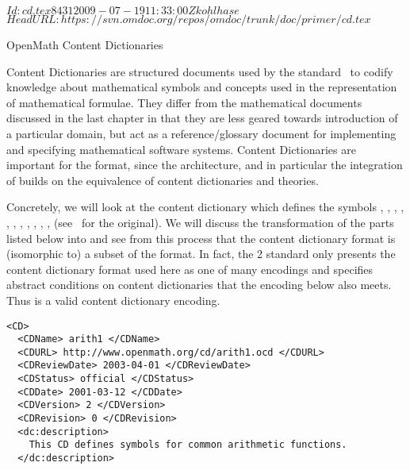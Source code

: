 \svnInfo $Id: cd.tex 8431 2009-07-19 11:33:00Z kohlhase $
\svnKeyword $HeadURL: https://svn.omdoc.org/repos/omdoc/trunk/doc/primer/cd.tex $

\begin{omgroup}[id=omcds]{OpenMath Content Dictionaries}

  Content Dictionaries are structured documents used by the {\openmath}
  standard~\cite{BusCapCar:2oms04} to codify knowledge about mathematical symbols and
  concepts used in the representation of mathematical formulae. They differ from the
  mathematical documents discussed in the last chapter in that they are less geared
  towards introduction of a particular domain, but act as a reference/glossary document
  for implementing and specifying mathematical software systems. Content Dictionaries are
  important for the {\omdoc} format, since the {\omdoc} architecture, and in particular
  the integration of {\openmath} builds on the equivalence of {\openmath} content
  dictionaries and {\omdoc} theories.

  Concretely, we will look at the content dictionary {} which defines
  the {\openmath} symbols {}, {}, {},
  {}, {}, {}, {},
  {}, {}, {}, {},
  {} (see~\cite{URL:omcd-core} for the original). We will discuss
  the transformation of the parts listed below into {\omdoc} and see from this process
  that the {\openmath} content dictionary format is (isomorphic to) a subset of the
  {\omdoc} format.  In fact, the {\openmath}2 standard only presents the content
  dictionary format used here as one of many encodings and specifies abstract conditions
  on content dictionaries that the {\omdoc} encoding below also meets. Thus {\omdoc} is a
  valid content dictionary encoding.

\begin{lstlisting}[language=omCD,label=lst:omcd,mathescape,
    caption={Part of the {\openmath} content dictionary {\snippet{arith1.ocd}}}]
<CD>
  <CDName> arith1 </CDName>
  <CDURL> http://www.openmath.org/cd/arith1.ocd </CDURL>
  <CDReviewDate> 2003-04-01 </CDReviewDate>
  <CDStatus> official </CDStatus>
  <CDDate> 2001-03-12 </CDDate>
  <CDVersion> 2 </CDVersion>
  <CDRevision> 0 </CDRevision>
  <dc:description> 
    This CD defines symbols for common arithmetic functions.
  </dc:description>


\end{lstlisting}
\end{omgroup}
